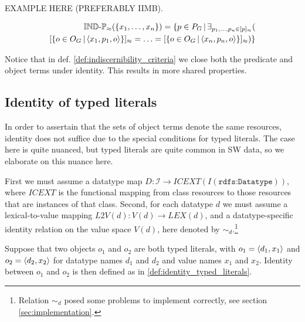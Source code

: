 EXAMPLE HERE (PREFERABLY IIMB).

\begin{definition}
\label{def:indiscernibility_criteria}
\begin{align}
  \indp_{\approx}(\setrange{x_1}{x_n})
=
  \setdef{
    p \in P_G
  }{
    \exists_{\range{p_1}{p_n} \in \equivset{p}}(\\
        \equivset{
          \setdef{
            o \in O_G
          }{
            \triple{x_1}{p_1}{o}
          }
        }
      =
        \ldots
      =
        \equivset{
          \setdef{
            o \in O_G
          }{
            \triple{x_n}{p_n}{o}
          }
        }
    )
  }\nonumber
\end{align}
\end{definition}

Notice that in def. \ref{def:indiscernibility_criteria}
  we close both the predicate and object terms under identity.
This results in more shared properties.

\begin{comment}
Drawing:
<s,p,o1>
<s,p,o2>
<o1,=,o2>
From IIMB data.
\end{comment}

\subsection{Identity of typed literals}

In order to assertain that the sets of object terms denote
  the same resources, identity does not suffice due to the special
  conditions for typed literals.
The case here is quite nuanced,
  but typed literals are quite common in SW data,
  so we elaborate on this nuance here.

First we must assume a datatype map
  $D : \mathcal{I} \rightarrow ICEXT(I(\texttt{rdfs:Datatype}))$,
  where $ICEXT$ is the functional mapping from class resources
  to those resources that are instances of that class.
Second, for each datatype $d$ we must assume a lexical-to-value mapping
  $L2V(d) : V(d) \rightarrow LEX(d)$,\cite{Hayes2004}
  and a datatype-specific identity relation on the value space $V(d)$,
  here denoted by $\sim_d$.\footnote{
    Relation $\sim_d$ posed some problems to implement correctly,
    see section \ref{sec:implementation}.}

Suppose that two objects $o_1$ and $o_2$ are both typed literals,
  with $o_1 = \langle d_1,x_1\rangle$ and $o_2 = \langle d_2,x_2\rangle$
  for datatype names $d_1$ and $d_2$ and value names $x_1$ and $x_2$.
Identity between $o_1$ and $o_2$ is then defined as in
  \ref{def:identity_typed_literals}.

